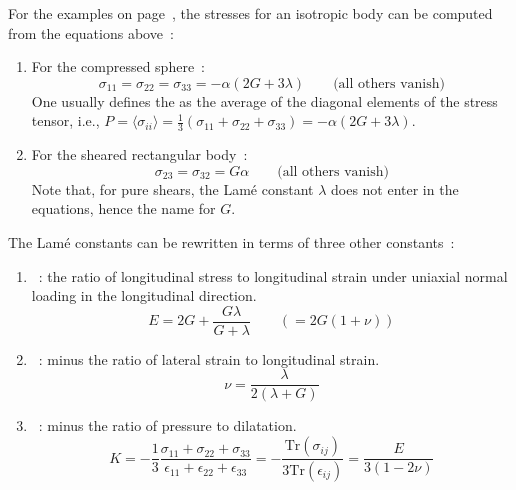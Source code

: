 For the examples on page~\pageref{strainexamples}, the stresses for an isotropic body can be computed from the equations above~:
\begin{enumerate}
\item For the compressed sphere~:
\begin{equation}
	\sigma_{11}=\sigma_{22}=\sigma_{33}=-\alpha(2G+3\lambda)\qquad\text{(all others vanish)}\nonumber
\end{equation}
One usually defines the  as the average of the diagonal elements of the stress tensor, i.e., $P=\langle\sigma_{ii}\rangle=\frac{1}{3}(\sigma_{11}+\sigma_{22}+\sigma_{33})=-\alpha(2G+3\lambda)$.

\item
For the sheared rectangular body~:
\begin{equation}
\sigma_{23}=\sigma_{32}=G\alpha\qquad\text{(all others vanish)}\nonumber
\end{equation}
Note that, for pure shears, the Lam\'e constant $\lambda$ does not enter in the equations, hence the name  for $G$.

\end{enumerate}

The Lam\'e constants can be rewritten in terms of three other constants~:
\begin{enumerate}
\item {}~: the ratio of longitudinal stress to longitudinal strain under uniaxial normal loading in the longitudinal direction.
\[
E=2G+\frac{G\lambda}{G+\lambda}\qquad(=2G(1+\nu))
\]
\item {}~: minus the ratio of lateral strain to longitudinal strain.
\[
\nu=\frac{\lambda}{2(\lambda+G)}
\]
\item {}~: minus the ratio of pressure to dilatation.
\[
K=-\frac{1}{3}\frac{\sigma_{11}+\sigma_{22}+\sigma_{33}}{\epsilon_{11}+\epsilon_{22}+\epsilon_{33}}=-\frac{\text{Tr}(\sigma_{ij})}{3\text{Tr}(\epsilon_{ij})}=\frac{E}{3(1-2\nu)}
\] 
\end{enumerate}

